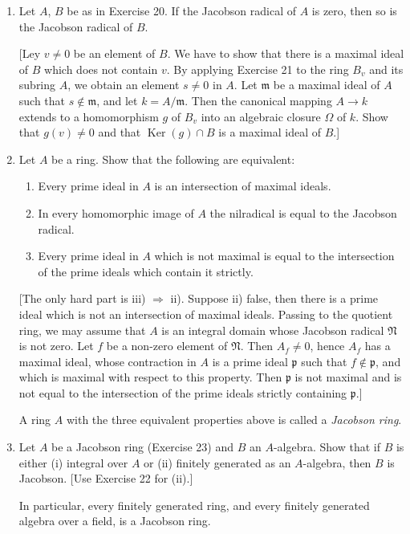 \begin{enumerate}
\item Let $A$, $B$ be as in Exercise 20. If the Jacobson radical of $A$ is zero, then so is the Jacobson radical of $B$.

[Ley $v\neq0$ be an element of $B$. We have to show that there is a maximal ideal of $B$ which does not contain $v$. By applying Exercise 21 to the ring $B_v$ and its subring $A$, we obtain an element $s\neq0$ in $A$. Let $\mathfrak m$ be a maximal ideal of $A$ such that $s\notin\mathfrak m$, and let $k=A/\mathfrak m$. Then the canonical mapping $A\longrightarrow k$ extends to a homomorphism $g$ of $B_v$ into an algebraic closure $\Omega$ of $k$. Show that $g(v)\neq0$ and that $\operatorname{Ker}(g)\cap B$ is a maximal ideal of $B$.]

\item Let $A$ be a ring. Show that the following are equivalent:
\begin{enumerate}
\renewcommand{\labelenumii}{\roman{enumii})}
\item Every prime ideal in $A$ is an intersection of maximal ideals.
\item In every homomorphic image of $A$ the nilradical is equal to the Jacobson radical.
\item Every prime ideal in $A$ which is not maximal is equal to the intersection of the prime ideals which contain it strictly.
\end{enumerate}
[The only hard part is iii) $\Rightarrow$ ii). Suppose ii) false, then there is a prime ideal which is not an intersection of maximal ideals. Passing to the quotient ring, we may assume that $A$ is an integral domain whose Jacobson radical $\mathfrak N$ is not zero. Let $f$ be a non-zero element of $\mathfrak N$. Then $A_f\neq0$, hence $A_f$ has a maximal ideal, whose contraction in $A$ is a prime ideal $\mathfrak p$ such that $f\notin\mathfrak p$, and which is maximal with respect to this property. Then $\mathfrak p$ is not maximal and is not equal to the intersection of the prime ideals strictly containing $\mathfrak p$.]

A ring $A$ with the three equivalent properties above is called a \textit{Jacobson ring}.

\item Let $A$ be a Jacobson ring (Exercise 23) and $B$ an $A$-algebra. Show that if $B$ is either (i) integral over $A$ or (ii) finitely generated as an $A$-algebra, then $B$ is Jacobson. [Use Exercise 22 for (ii).]

In particular, every finitely generated ring, and every finitely generated algebra over a field, is a Jacobson ring.


\end{enumerate}
